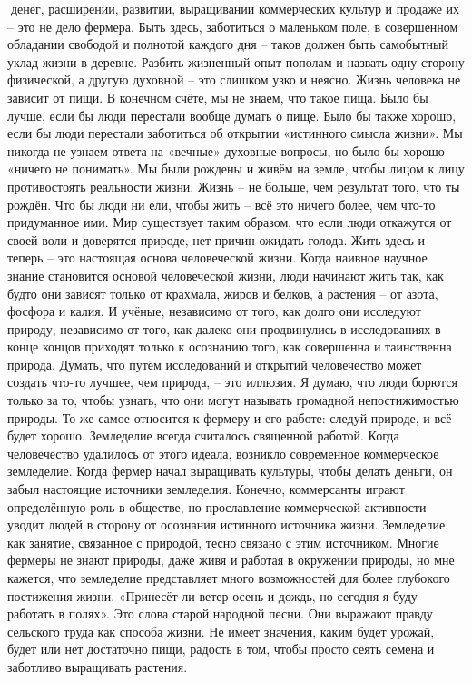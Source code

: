 \documentclass[a4paper]{book}
\begin{document}
денег, расширении, развитии, выращивании коммерческих культур и продаже их – это не
дело фермера. Быть здесь, заботиться о маленьком поле, в совершенном обладании свободой
и полнотой каждого дня – таков должен быть самобытный уклад жизни в деревне.
Разбить жизненный опыт пополам и назвать одну сторону физической, а другую
духовной – это слишком узко и неясно. Жизнь человека не зависит от пищи. В конечном
счёте, мы не знаем, что такое пища. Было бы лучше, если бы люди перестали вообще думать
о пище. Было бы также хорошо, если бы люди перестали заботиться об открытии «истинного
смысла жизни». Мы никогда не узнаем ответа на «вечные» духовные вопросы, но было бы
хорошо «ничего не понимать». Мы были рождены и живём на земле, чтобы лицом к лицу
противостоять реальности жизни.
Жизнь – не больше, чем результат того, что ты рождён. Что бы люди ни ели, чтобы
жить – всё это ничего более, чем что-то придуманное ими. Мир существует таким образом,
что если люди откажутся от своей воли и доверятся природе, нет причин ожидать голода.
Жить здесь и теперь – это настоящая основа человеческой жизни. Когда наивное
научное знание становится основой человеческой жизни, люди начинают жить так, как будто
они зависят только от крахмала, жиров и белков, а растения – от азота, фосфора и калия.
И учёные, независимо от того, как долго они исследуют природу, независимо от того,
как далеко они продвинулись в исследованиях в конце концов приходят только к осознанию
того, как совершенна и таинственна природа. Думать, что путём исследований и открытий
человечество может создать что-то лучшее, чем природа, – это иллюзия. Я думаю, что люди
борются только за то, чтобы узнать, что они могут называть громадной непостижимостью
природы.
То же самое относится к фермеру и его работе: следуй природе, и всё будет хорошо.
Земледелие всегда считалось священной работой. Когда человечество удалилось от этого
идеала, возникло современное коммерческое земледелие. Когда фермер начал выращивать
культуры, чтобы делать деньги, он забыл настоящие источники земледелия.
Конечно, коммерсанты играют определённую роль в обществе, но прославление
коммерческой активности уводит людей в сторону от осознания истинного источника
жизни. Земледелие, как занятие, связанное с природой, тесно связано с этим источником.
Многие фермеры не знают природы, даже живя и работая в окружении природы, но мне
кажется, что земледелие представляет много возможностей для более глубокого постижения
жизни.
«Принесёт ли ветер осень и дождь, но сегодня я буду работать в полях». Это слова
старой народной песни. Они выражают правду сельского труда как способа жизни. Не имеет
значения, каким будет урожай, будет или нет достаточно пищи, радость в том, чтобы просто
сеять семена и заботливо выращивать растения.
\end{document}
